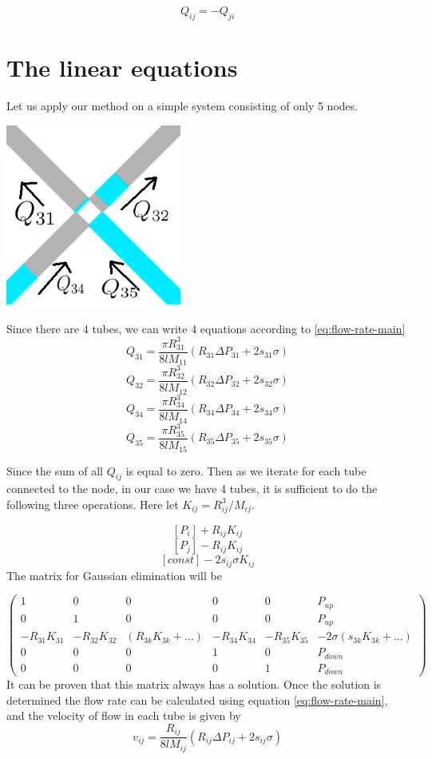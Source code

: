 	\begin{equation}
	Q_{ij} = -Q_{ji}
	\end{equation}


\section{The linear equations} \label{sec:linear-equ}

	Let us apply our method on a simple system consisting of only 5 nodes.

	\includegraphics[height=6cm]{diagram/fig_simple-5-nodes}

	Since there are 4 tubes, we can write 4 equations according to \ref{eq:flow-rate-main}
	\[ Q_{31} = \frac{\pi R_{31}^3}{8lM_{11}}(R_{31}\Delta P_{31} + 2s_{31}\sigma) \]
	\[ Q_{32} = \frac{\pi R_{32}^3}{8lM_{12}}(R_{32}\Delta P_{32} + 2s_{32}\sigma) \]
	\[ Q_{34} = \frac{\pi R_{34}^3}{8lM_{14}}(R_{34}\Delta P_{34} + 2s_{34}\sigma) \]
	\[ Q_{35} = \frac{\pi R_{35}^3}{8lM_{15}}(R_{35}\Delta P_{35} + 2s_{35}\sigma) \]

	Since the sum of all $Q_{ij}$ is equal to zero. Then as we iterate for each tube connected to the node, in our case we have 4 tubes, it is sufficient to do the following three operations. Here let $K_{ij} = R^3_{ij}/{M}_{ij}$.

	\[ [P_i] + R_{ij}K_{ij} \]
	\[ [P_j] - R_{ij}K_{ij} \]
	\[ [const] - 2s_{ij}\sigma K_{ij} \]
	The matrix for Gaussian elimination will be

	\[ 
	\begin{pmatrix}
		1 & 0 & 0 & 0 & 0 & P_{up}\\
		0 & 1 & 0 & 0 & 0 & P_{up}\\
		-R_{31}K_{31} & -R_{32}K_{32} & (R_{3k}K_{3k} + ...) & -R_{34}K_{34} & -R_{35}K_{35} & -2\sigma(s_{3k}K_{3k} + ...)\\
		0 & 0 & 0 & 1 & 0 & P_{down}\\
		0 & 0 & 0 & 0 & 1 & P_{down}
	\end{pmatrix}
	\]
	 It can be proven that this matrix always has a solution. Once the solution is determined the flow rate can be calculated using equation \ref{eq:flow-rate-main}, and the velocity of flow in each tube is given by
	\begin{equation} \label{eq:velocity-in-tube}
	\boxed{v_{ij} = \frac{R_{ij}}{8lM_{ij}}(R_{ij}\Delta P_{ij} + 2s_{ij}\sigma)}
	\end{equation}
